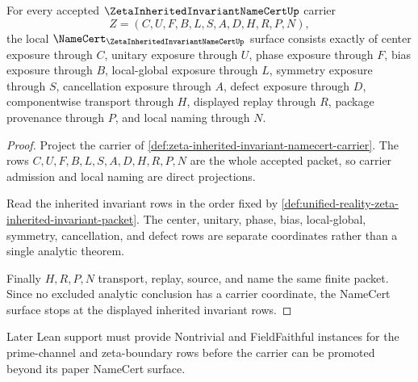 \begin{theorem}
\label{thm:zeta-inherited-invariant-namecert-obligations}
For every accepted $\ZetaInheritedInvariantNameCertUp$ carrier
$$
Z=(C,U,F,B,L,S,A,D,H,R,P,N),
$$
the local $\NameCert_{\ZetaInheritedInvariantNameCertUp}$ surface consists exactly of center exposure through $C$, unitary exposure through $U$, phase exposure through $F$, bias exposure through $B$, local-global exposure through $L$, symmetry exposure through $S$, cancellation exposure through $A$, defect exposure through $D$, componentwise transport through $H$, displayed replay through $R$, package provenance through $P$, and local naming through $N$.
\end{theorem}
\begin{proof}
Project the carrier of \autoref{def:zeta-inherited-invariant-namecert-carrier}. The rows $C,U,F,B,L,S,A,D,H,R,P,N$ are the whole accepted packet, so carrier admission and local naming are direct projections.

Read the inherited invariant rows in the order fixed by \autoref{def:unified-reality-zeta-inherited-invariant-packet}. The center, unitary, phase, bias, local-global, symmetry, cancellation, and defect rows are separate coordinates rather than a single analytic theorem.

Finally $H,R,P,N$ transport, replay, source, and name the same finite packet. Since no excluded analytic conclusion has a carrier coordinate, the NameCert surface stops at the displayed inherited invariant rows.
\end{proof}



Later Lean support must provide Nontrivial and FieldFaithful instances for the prime-channel and zeta-boundary rows before the carrier can be promoted beyond its paper NameCert surface.

